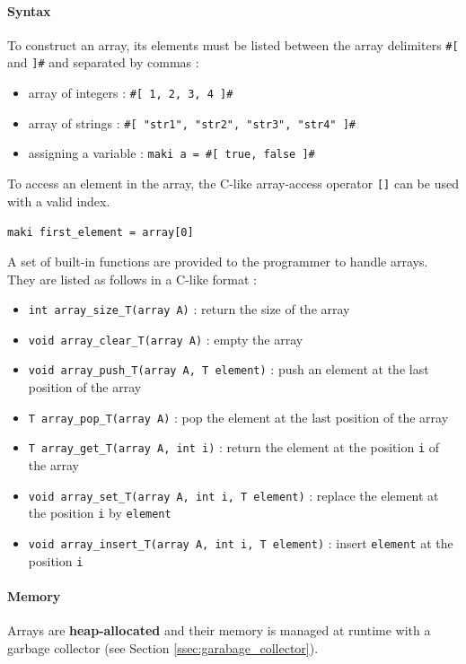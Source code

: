 \documentclass[a4paper,11pt]{article}
\begin{document}
\paragraph{Syntax}
To construct an array, its elements must be listed between the array delimiters \texttt{\#[} and \texttt{]\#} and separated by commas  : 
\begin{itemize}
	\item array of integers : \texttt{\#[ 1, 2, 3, 4 ]\#} 
	\item array of strings : \texttt{\#[ "str1", "str2", "str3", "str4" ]\#} 
	\item assigning a variable : \texttt{maki a = \#[ true, false ]\#}
\end{itemize}
To access an element in the array, the C-like array-access operator \texttt{[]} can be used with a valid index. 
\begin{center}
	\texttt{maki first\_element = array[0]}
\end{center}
A set of built-in functions are provided to the programmer to handle arrays. They are listed as follows in a C-like format :
\begin{itemize}
	\item \texttt{int array\_size\_T(array A)} : return the size of the array
	\item \texttt{void array\_clear\_T(array A)} : empty the array
	\item \texttt{void array\_push\_T(array A, T element)} : push an element at the last position of the array
	\item \texttt{T array\_pop\_T(array A)} : pop the element at the last position of the array
	\item \texttt{T array\_get\_T(array A, int i)} : return the element at the position \texttt{i} of the array
	\item \texttt{void array\_set\_T(array A, int i, T element)} : replace the element at the position \texttt{i} by \texttt{element}
	\item \texttt{void array\_insert\_T(array A, int i, T element)} : insert \texttt{element} at the position \texttt{i}
\end{itemize}
\paragraph{Memory} Arrays are \textbf{heap-allocated} and their memory is managed at runtime with a garbage collector (see Section \ref{ssec:garabage_collector}).
\end{document}
